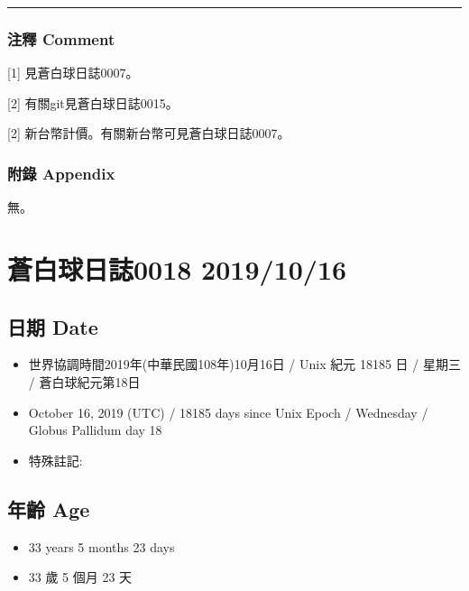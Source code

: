 \documentclass[
]{article}
\providecommand{\tightlist}{%
  \setlength{\itemsep}{0pt}\setlength{\parskip}{0pt}}
\begin{document}
\begin{center}\rule{0.5\linewidth}{\linethickness}\end{center}

\hypertarget{ux6ce8ux91cb-comment-10}{%
\subsubsection{注釋 Comment}\label{ux6ce8ux91cb-comment-10}}

{[}1{]} 見蒼白球日誌0007。

{[}2{]} 有關git見蒼白球日誌0015。

{[}2{]} 新台幣計價。有關新台幣可見蒼白球日誌0007。

\hypertarget{ux9644ux9304-appendix-9}{%
\subsubsection{附錄 Appendix}\label{ux9644ux9304-appendix-9}}

無。

\hypertarget{ux84bcux767dux7403ux65e5ux8a8c0018-20191016}{%
\section{蒼白球日誌0018
2019/10/16}\label{ux84bcux767dux7403ux65e5ux8a8c0018-20191016}}

\hypertarget{ux65e5ux671f-date-15}{%
\subsection{日期 Date}\label{ux65e5ux671f-date-15}}

\begin{itemize}
\tightlist
\item
  世界協調時間2019年(中華民國108年)10月16日 / Unix 紀元 18185 日 /
  星期三 / 蒼白球紀元第18日
\item
  October 16, 2019 (UTC) / 18185 days since Unix Epoch / Wednesday /
  Globus Pallidum day 18
\item
  特殊註記:
\end{itemize}

\hypertarget{ux5e74ux9f61-age-15}{%
\subsection{年齡 Age}\label{ux5e74ux9f61-age-15}}

\begin{itemize}
\tightlist
\item
  33 years 5 months 23 days
\item
  33 歲 5 個月 23 天
\end{itemize}
\end{document}
